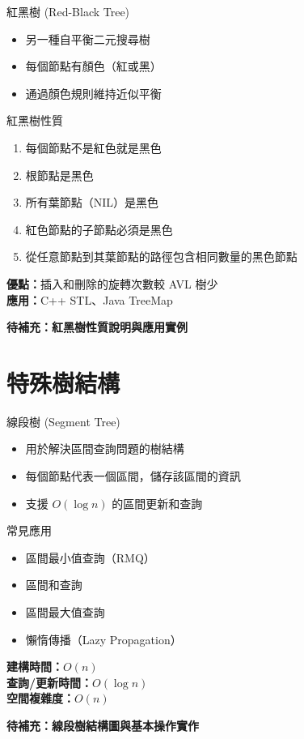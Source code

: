 \documentclass{beamer}
\begin{document}
\begin{frame}{紅黑樹 (Red-Black Tree)}
\begin{itemize}
    \item 另一種自平衡二元搜尋樹
    \item 每個節點有顏色（紅或黑）
    \item 通過顏色規則維持近似平衡
\end{itemize}

\vspace{1em}
\begin{block}{紅黑樹性質}
\begin{enumerate}
    \item 每個節點不是紅色就是黑色
    \item 根節點是黑色
    \item 所有葉節點（NIL）是黑色
    \item 紅色節點的子節點必須是黑色
    \item 從任意節點到其葉節點的路徑包含相同數量的黑色節點
\end{enumerate}
\end{block}

\vspace{1em}
\textbf{優點：}插入和刪除的旋轉次數較 AVL 樹少\\
\textbf{應用：}C++ STL、Java TreeMap

\vspace{1em}
\textbf{待補充：紅黑樹性質說明與應用實例}
\end{frame}

\section{特殊樹結構}

\begin{frame}{線段樹 (Segment Tree)}
\begin{itemize}
    \item 用於解決區間查詢問題的樹結構
    \item 每個節點代表一個區間，儲存該區間的資訊
    \item 支援 $O(\log n)$ 的區間更新和查詢
\end{itemize}

\vspace{1em}
\begin{block}{常見應用}
\begin{itemize}
    \item 區間最小值查詢（RMQ）
    \item 區間和查詢
    \item 區間最大值查詢
    \item 懶惰傳播（Lazy Propagation）
\end{itemize}
\end{block}

\vspace{1em}
\textbf{建構時間：}$O(n)$\\
\textbf{查詢/更新時間：}$O(\log n)$\\
\textbf{空間複雜度：}$O(n)$

\vspace{1em}
\textbf{待補充：線段樹結構圖與基本操作實作}
\end{frame}
\end{document}
